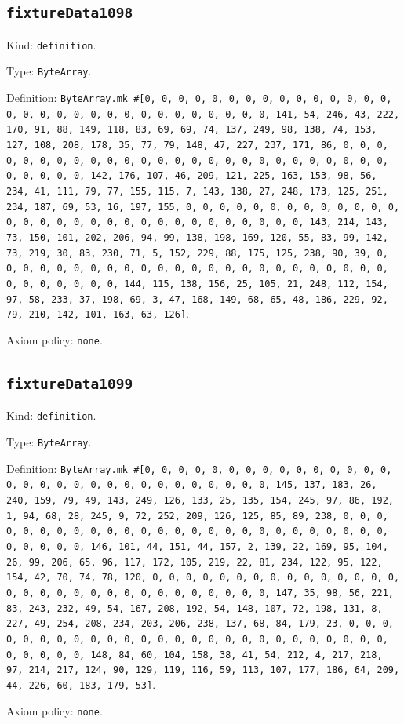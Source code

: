 \documentclass[11pt]{article}
\begin{document}
\subsection*{\texttt{fixtureData1098}}
\noindent Kind: \texttt{definition}.\par
\noindent Type: \texttt{ByteArray}.\par
\noindent Definition: \texttt{ByteArray.mk \#[0, 0, 0, 0, 0, 0, 0, 0, 0, 0, 0, 0, 0, 0, 0, 0, 0, 0, 0, 0, 0, 0, 0, 0, 0, 0, 0, 0, 0, 0, 0, 141, 54, 246, 43, 222, 170, 91, 88, 149, 118, 83, 69, 69, 74, 137, 249, 98, 138, 74, 153, 127, 108, 208, 178, 35, 77, 79, 148, 47, 227, 237, 171, 86, 0, 0, 0, 0, 0, 0, 0, 0, 0, 0, 0, 0, 0, 0, 0, 0, 0, 0, 0, 0, 0, 0, 0, 0, 0, 0, 0, 0, 0, 0, 0, 142, 176, 107, 46, 209, 121, 225, 163, 153, 98, 56, 234, 41, 111, 79, 77, 155, 115, 7, 143, 138, 27, 248, 173, 125, 251, 234, 187, 69, 53, 16, 197, 155, 0, 0, 0, 0, 0, 0, 0, 0, 0, 0, 0, 0, 0, 0, 0, 0, 0, 0, 0, 0, 0, 0, 0, 0, 0, 0, 0, 0, 0, 0, 0, 143, 214, 143, 73, 150, 101, 202, 206, 94, 99, 138, 198, 169, 120, 55, 83, 99, 142, 73, 219, 30, 83, 230, 71, 5, 152, 229, 88, 175, 125, 238, 90, 39, 0, 0, 0, 0, 0, 0, 0, 0, 0, 0, 0, 0, 0, 0, 0, 0, 0, 0, 0, 0, 0, 0, 0, 0, 0, 0, 0, 0, 0, 0, 0, 144, 115, 138, 156, 25, 105, 21, 248, 112, 154, 97, 58, 233, 37, 198, 69, 3, 47, 168, 149, 68, 65, 48, 186, 229, 92, 79, 210, 142, 101, 163, 63, 126]}.\par
\noindent Axiom policy: \texttt{none}.\par
\subsection*{\texttt{fixtureData1099}}
\noindent Kind: \texttt{definition}.\par
\noindent Type: \texttt{ByteArray}.\par
\noindent Definition: \texttt{ByteArray.mk \#[0, 0, 0, 0, 0, 0, 0, 0, 0, 0, 0, 0, 0, 0, 0, 0, 0, 0, 0, 0, 0, 0, 0, 0, 0, 0, 0, 0, 0, 0, 0, 145, 137, 183, 26, 240, 159, 79, 49, 143, 249, 126, 133, 25, 135, 154, 245, 97, 86, 192, 1, 94, 68, 28, 245, 9, 72, 252, 209, 126, 125, 85, 89, 238, 0, 0, 0, 0, 0, 0, 0, 0, 0, 0, 0, 0, 0, 0, 0, 0, 0, 0, 0, 0, 0, 0, 0, 0, 0, 0, 0, 0, 0, 0, 0, 146, 101, 44, 151, 44, 157, 2, 139, 22, 169, 95, 104, 26, 99, 206, 65, 96, 117, 172, 105, 219, 22, 81, 234, 122, 95, 122, 154, 42, 70, 74, 78, 120, 0, 0, 0, 0, 0, 0, 0, 0, 0, 0, 0, 0, 0, 0, 0, 0, 0, 0, 0, 0, 0, 0, 0, 0, 0, 0, 0, 0, 0, 0, 0, 147, 35, 98, 56, 221, 83, 243, 232, 49, 54, 167, 208, 192, 54, 148, 107, 72, 198, 131, 8, 227, 49, 254, 208, 234, 203, 206, 238, 137, 68, 84, 179, 23, 0, 0, 0, 0, 0, 0, 0, 0, 0, 0, 0, 0, 0, 0, 0, 0, 0, 0, 0, 0, 0, 0, 0, 0, 0, 0, 0, 0, 0, 0, 0, 148, 84, 60, 104, 158, 38, 41, 54, 212, 4, 217, 218, 97, 214, 217, 124, 90, 129, 119, 116, 59, 113, 107, 177, 186, 64, 209, 44, 226, 60, 183, 179, 53]}.\par
\noindent Axiom policy: \texttt{none}.\par
\end{document}
